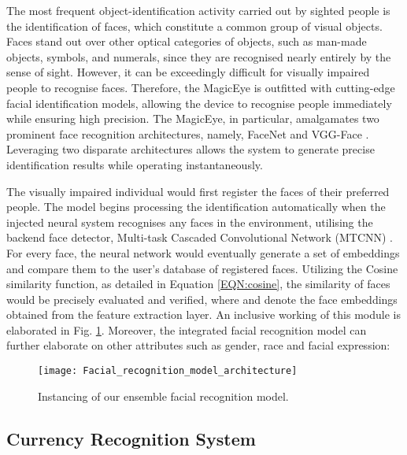 \documentclass[journal,12pt,onecolumn,letterpaper]{IEEEtran}
\begin{document}
The most frequent object-identification activity carried out by sighted people is the identification of faces, which constitute a common group of visual objects. Faces stand out over other optical categories of objects, such as man-made objects, symbols, and numerals, since they are recognised nearly entirely by the sense of sight. However, it can be exceedingly difficult for visually impaired people to recognise faces. Therefore, the MagicEye is outfitted with cutting-edge facial identification models, allowing the device to recognise people immediately while ensuring high precision. The MagicEye, in particular, amalgamates two prominent face recognition architectures, namely, FaceNet \cite{schroff_facenet_2015} and VGG-Face \cite{qawaqneh_deep_2017}. Leveraging two disparate architectures allows the system to generate precise identification results while operating instantaneously.

The visually impaired individual would first register the faces of their preferred people. The model begins processing the identification automatically when the injected neural system recognises any faces in the environment, utilising the backend face detector, Multi-task Cascaded Convolutional Network (MTCNN) \cite{zhang_joint_2016}.  For every face, the neural network would eventually generate a set of embeddings and compare them to the user's database of registered faces. Utilizing the Cosine similarity function, as detailed in Equation \ref{EQN:cosine}, the similarity of faces would be precisely evaluated and verified, where  and  denote the face embeddings obtained from the feature extraction layer. An inclusive working of this module is elaborated in Fig. \ref{FIG:Facial_recognition_model_architecture}. Moreover, the integrated facial recognition model can further elaborate on other attributes such as gender, race and facial expression:


\begin{figure}[htbp]
\centering
\texttt{[image: Facial\_recognition\_model\_architecture]}
\caption{Instancing of our ensemble facial recognition model.}
\label{FIG:Facial_recognition_model_architecture}
\end{figure}


\subsection{Currency Recognition System}
\end{document}

